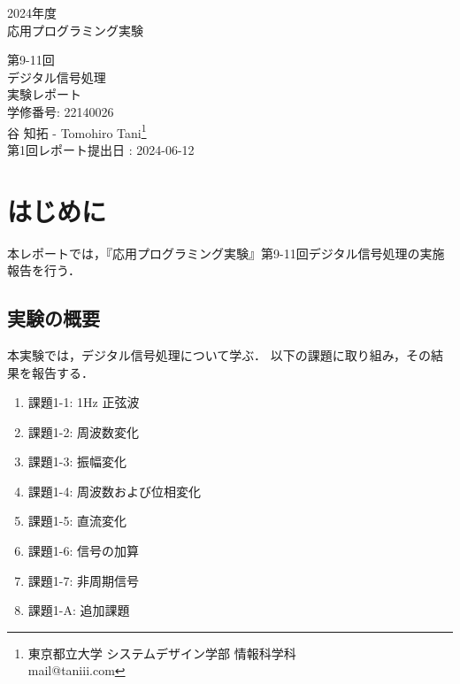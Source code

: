 \documentclass[fleqn, a4paper. 12pt]{jsarticle}
\begin{document}
  \begin{titlepage}
    \begin{center}
      {\Huge 2024年度\\応用プログラミング実験}
      
      \vspace{4cm}
      {\Huge 第9-11回\\デジタル信号処理\\
        実験レポート\\
      }
      \vspace{4cm}
      {\large 学修番号: 22140026\\谷 知拓 - Tomohiro Tani\footnote{東京都立大学 システムデザイン学部 情報科学科 \\ mail@taniii.com} \\}
      \vspace{0.5cm}
      {\large
        第1回レポート提出日 : 2024-06-12 \\
      }
    \end{center}
  \end{titlepage}

  \section*{はじめに}

    本レポートでは，『応用プログラミング実験』第9-11回デジタル信号処理の実施報告を行う．

  \subsection*{実験の概要}

    本実験では，デジタル信号処理について学ぶ．
    以下の課題に取り組み，その結果を報告する．

    \begin{enumerate}
      \item 課題1-1: 1Hz 正弦波
      \item 課題1-2: 周波数変化
      \item 課題1-3: 振幅変化
      \item 課題1-4: 周波数および位相変化
      \item 課題1-5: 直流変化
      \item 課題1-6: 信号の加算
      \item 課題1-7: 非周期信号
      \item 課題1-A: 追加課題
    \end{enumerate}
\end{document}

